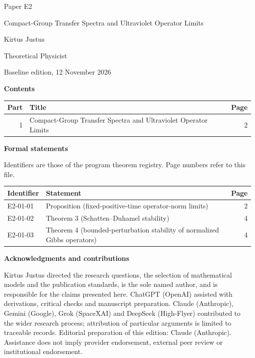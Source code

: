 \documentclass[11pt,a4paper]{article}
\begin{document}
\thispagestyle{empty}\pagestyle{empty}
{\small\sffamily \ProgramTitle\hfill Paper E2\par}
\vspace*{12mm}
{\LARGE\bfseries\raggedright{} Compact-Group Transfer Spectra and Ultraviolet Operator Limits\par}
\vspace{9mm}
{\large Kirtus Justus\par}\vspace{1mm}Theoretical Physicist\par\AuthorLocation\par\vspace{2mm}Baseline edition, 12 November 2026\par\vspace{8mm}
\textbf{Contents}\par\vspace{1mm}
{\small\begin{longtable}{@{}r>{\raggedright\arraybackslash}p{}r@{}}
\toprule Part & Title & Page\\\midrule\endhead
1 & Compact-Group Transfer Spectra and Ultraviolet Operator Limits & 2\\
\bottomrule\end{longtable}}
\vspace{2mm}\textbf{Formal statements}\par\vspace{1mm}
{\footnotesize Identifiers are those of the program theorem registry. Page numbers refer to this file.\par}
{\footnotesize\begin{longtable}{@{}l>{\raggedright\arraybackslash}p{}r@{}}
\toprule Identifier & Statement & Page\\\midrule\endhead
E2-01-01 & Proposition (fixed-positive-time operator-norm limits) & 2\\
E2-01-02 & Theorem 3 (Schatten–Duhamel stability) & 4\\
E2-01-03 & Theorem 4 (bounded-perturbation stability of normalized Gibbs operators) & 4\\
\bottomrule\end{longtable}}
\vspace{3mm}\textbf{Acknowledgments and contributions}\par
{\small Kirtus Justus directed the research questions, the selection of mathematical models and the publication standards, is the sole named author, and is responsible for the claims presented here. ChatGPT (OpenAI) assisted with derivations, critical checks and manuscript preparation. Claude (Anthropic), Gemini (Google), Grok (SpaceXAI) and DeepSeek (High-Flyer) contributed to the wider research process; attribution of particular arguments is limited to traceable records. Editorial preparation of this edition: Claude (Anthropic). Assistance does not imply provider endorsement, external peer review or institutional endorsement.\par}
\end{document}
